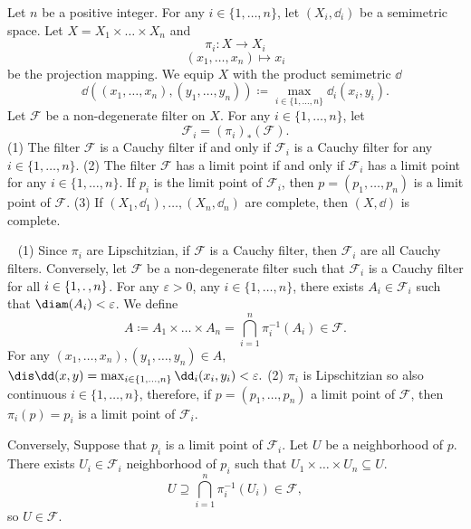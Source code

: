 \begin{propositionenv}
    Let $n$ be a positive integer. For any $i\in\{1,\ldots,n\}$, let $(X_i,\dd_i)$ be a semimetric space. Let $X=X_1\times\ldots\times X_n$ and 
    $$\pi_i:X\longrightarrow X_i$$
    $$(x_1,\ldots,x_n)\longmapsto x_i$$
    be the projection mapping. We equip $X$ with the product semimetric $\dd$
    $$\dd((x_1,\ldots,x_n),(y_1,\ldots,y_n))\coloneqq \max_{i\in\{1,\ldots,n\}}\dd_i(x_i,y_i).$$
    Let $\mathcal{F}$ be a non-degenerate filter on $X$. For any $i\in\{1,\ldots, n\}$, let
    $$\mathcal{F}_i=\left(\pi_i\right)_{*}\left(\mathcal{F}\right).$$ 
    (1) The filter $\mathcal{F}$ is a Cauchy filter if and only if $\mathcal{F}_i$ is a Cauchy filter for any $i\in \{1,\ldots,n\}$.
    \newline
    (2) The filter $\mathcal{F}$ has a limit point if and only if $\mathcal{F}_i$ has a limit point for any $i\in \{1,\ldots,n\}$. If $p_i$ is the limit point of $\mathcal{F}_i$, then $p=\left(p_1,\ldots,p_n\right)$ is a limit point of $\mathcal{F}$.
    \newline
    (3) If $\left(X_1,\dd_1\right),\ldots,\left(X_n,\dd_n\right)$ are complete, then $(X,\dd)$ is complete.
\end{propositionenv}
\begin{proofenv}
    \ \newline
    (1)
    Since $\pi_i$ are Lipschitzian, if $\mathcal{F}$ is a Cauchy filter, then $\mathcal{F}_i$  are all Cauchy filters. Conversely, let $\mathcal{F}$ be a non-degenerate filter such that $\mathcal{F}_i$ is a Cauchy filter for all $i\in\{1,\ldotp,n\}$. For any $\varepsilon>0$, any $i\in\{1,\ldots,n\}$, there exists $A_i\in \mathcal{F}_i$ such that $\diam(A_i)<\varepsilon$. We define 
    $$A\coloneqq A_1\times\ldots\times A_n=\bigcap_{i=1}^n\pi_{i}^{-1}\left(A_i\right)\in\mathcal{F}.$$
    For any $\left(x_1,\ldots,x_n\right),\left(y_1,\ldots,y_n\right)\in A$, $\dis\dd(x,y)=\max_{i\in\{1,\ldots,n\}}\dd_{i}(x_i,y_i)<\varepsilon.$
    \newline
    (2) $\pi_i$ is Lipschitzian so also continuous $i\in \{1,\ldots,n\}$, therefore, if $p=(p_1,\ldots,p_n)$ a limit point of $\mathcal{F}$, then $\pi_i(p)=p_i$ is a limit point of $\mathcal{F}_i$. 
    
    \quad Conversely, Suppose that $p_i$ is a limit point of $\mathcal{F}_i$. Let $U$ be a neighborhood of $p$. There exists $U_i\in\mathcal{F}_i$ neighborhood of $p_i$ such that $U_1\times \ldots\times U_n\subseteq U$.
    $$U\supseteq \bigcap_{i=1}^n\pi_{i}^{-1}\left(U_i\right)\in\mathcal{F},$$
    so $U\in\mathcal{F}$.
\end{proofenv}
